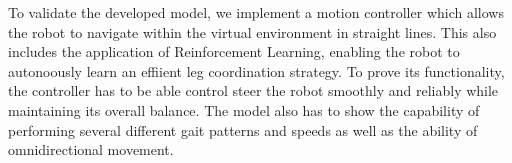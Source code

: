 To validate the developed model, we implement a motion controller which allows the robot to navigate within the virtual environment in straight lines. This also includes the application of Reinforcement Learning, enabling the robot to autonoously learn an effiient leg coordination strategy.
To prove its functionality, the controller has to be able control steer the robot smoothly and reliably while maintaining its overall balance.
The model also has to show the capability of performing several different gait patterns and speeds as well as the ability of omnidirectional movement.





